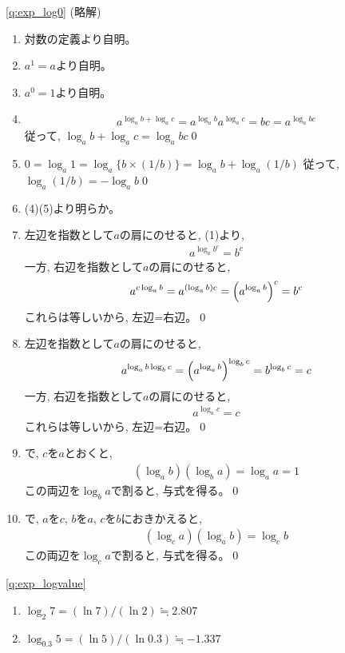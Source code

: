 \ref{q:exp_log0} (略解)
\begin{enumerate}
\item 対数の定義より自明。
\item $a^1=a$より自明。
\item $a^0=1$より自明。
\item 
\begin{eqnarray*}a^{\log_a b+\log_a c}=a^{\log_a b}a^{\log_a c}=bc=a^{\log_a bc}\end{eqnarray*}
従って, $\log_a b+\log_a c=\log_a bc$\qed
\mv
\item $0=\log_a 1=\log_a \{b\times(1/b)\}=\log_a b+\log_a (1/b)$
従って, $\log_a (1/b)=-\log_a b$\qed
\mv
\item (4)(5)より明らか。
\item 左辺を指数として$a$の肩にのせると, (1)より, 
\begin{eqnarray*}a^{\log_a b^c}=b^c\end{eqnarray*}
一方, 右辺を指数として$a$の肩にのせると, 
\[a^{c\log_a b}=a^{(\log_a b)c}=\Bigl(a^{\log_a b}\Bigr)^c=b^c\]
これらは等しいから, 左辺=右辺。\qed
\mv
\item 左辺を指数として$a$の肩にのせると, 
\begin{eqnarray*}
a^{\log_a b \log_b c}=\Bigl(a^{\log_a b}\Bigr)^{\log_b c}=b^{\log_b c}=c
\end{eqnarray*}
一方, 右辺を指数として$a$の肩にのせると, 
\begin{eqnarray*}
a^{\log_a c}=c
\end{eqnarray*}
これらは等しいから, 左辺=右辺。\qed
\item {}で, $c$を$a$とおくと,
\begin{eqnarray*}(\log_a b) (\log_b a)=\log_a a=1\end{eqnarray*}
この両辺を$\log_b a$で割ると, 与式を得る。\qed
\item {}で, $a$を$c$, $b$を$a$, $c$を$b$におきかえると, 
\begin{eqnarray*}(\log_c a)(\log_a b)=\log_c b\end{eqnarray*}
この両辺を$\log_c a$で割ると, 与式を得る。\qed
\end{enumerate}
\mv

\ref{q:exp_logvalue}
\begin{enumerate}
\item $\log_2 7=(\ln 7) / (\ln 2)\fallingdotseq2.807$
\item $\log_{0.3} 5=(\ln 5) / (\ln 0.3)\fallingdotseq -1.337$
\end{enumerate}
\mv


